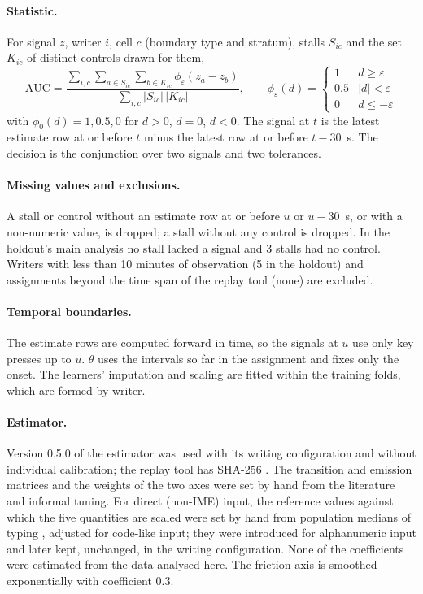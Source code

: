 \paragraph{Statistic.} For signal $z$, writer $i$, cell $c$ (boundary type and stratum), stalls $S_{ic}$ and the set
$K_{ic}$ of distinct controls drawn for them,
\[
\mathrm{AUC} = \frac{\sum_{i,c} \sum_{a \in S_{ic}} \sum_{b \in K_{ic}} \phi_\varepsilon(z_a - z_b)}
{\sum_{i,c} |S_{ic}|\,|K_{ic}|}, \qquad
\phi_\varepsilon(d) = \begin{cases} 1 & d \ge \varepsilon \\ 0.5 & |d| < \varepsilon \\ 0 & d \le -\varepsilon
\end{cases}
\]
with $\phi_0(d) = 1, 0.5, 0$ for $d > 0$, $d = 0$, $d < 0$. The signal at $t$ is the latest estimate row at or before $t$
minus the latest row at or before $t - 30$~s. The decision is the conjunction over two signals and two tolerances.

\paragraph{Missing values and exclusions.} A stall or control without an estimate row at or before $u$ or $u - 30$~s, or
with a non-numeric value, is dropped; a stall without any control is dropped. In the holdout's main analysis no stall
lacked a signal and 3 stalls had no control. Writers with less than 10 minutes of observation (5 in the holdout) and
assignments beyond the time span of the replay tool (none) are excluded.

\paragraph{Temporal boundaries.} The estimate rows are computed forward in time, so the signals at $u$ use only key
presses up to $u$. $\theta$ uses the intervals so far in the assignment and fixes only the onset. The learners' imputation
and scaling are fitted within the training folds, which are formed by writer.

\paragraph{Estimator.} Version 0.5.0 of the estimator was used with its writing configuration and without individual
calibration; the replay tool has SHA-256 \texttt{}. The
transition and emission matrices and the weights of the two axes were set by hand from the literature and informal
tuning. For direct (non-IME) input, the reference values against which the five quantities are scaled were set by hand
from population medians of typing \cite{dhakal2018typing}, adjusted for code-like input; they were introduced for
alphanumeric input and later kept, unchanged, in the writing configuration. None of the coefficients were estimated
from the data analysed here. The friction axis is smoothed exponentially with coefficient 0.3.

